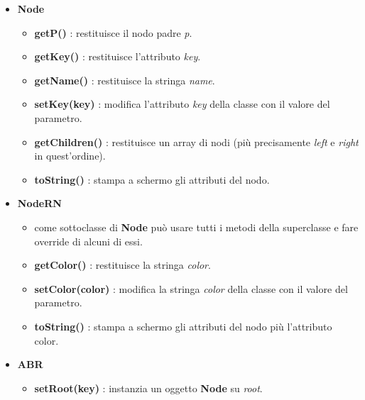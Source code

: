 \begin{itemize}

    \item \textbf{Node}
    \begin{itemize}
    
        \item \textbf{getP()} : restituisce il nodo padre \textit{p}.
        
        \item \textbf{getKey()} : restituisce l'attributo \textit{key}.
        
        \item \textbf{getName()} : restituisce la stringa \textit{name}.
        
        \item \textbf{setKey(key)} : modifica l'attributo \textit{key} della classe con il valore del parametro.
        
        \item \textbf{getChildren()} : restituisce un array di nodi (più precisamente \textit{left} e \textit{right} in quest'ordine).
        
        \item \textbf{toString()} : stampa a schermo gli attributi del nodo.
        
    \end{itemize}
    
    \item \textbf{NodeRN}
    \begin{itemize}
        \item come sottoclasse di \textbf{Node} può usare tutti i metodi della superclasse e fare override di alcuni di essi.
        
        \item \textbf{getColor()} : restituisce la stringa \textit{color}.
        
        \item \textbf{setColor(color)} : modifica la stringa \textit{color} della classe con il valore del parametro.
        
        \item \textbf{toString()} : stampa a schermo gli attributi del nodo più l'attributo color.
        
    \end{itemize}
    
    \item \textbf{ABR}
    \begin{itemize}
        \item \textbf{setRoot(key)} : instanzia un oggetto \textbf{Node} su \textit{root}.
        

\end{itemize}
\end{itemize}

